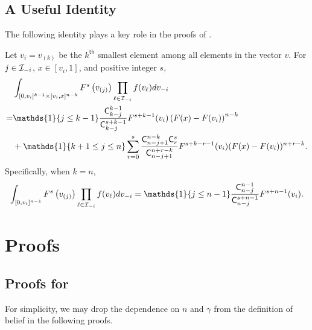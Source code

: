 \subsection{A Useful Identity}
\label{app_subec:identity}
The following identity plays a key role in the proofs of .
\begin{lemma}
\label{lem:useful_identity} Let $v_i = v_{(k)}$ be the $k^{\mathsf{th}}$ smallest element among all elements in the vector $v$. For $j\in \mathcal{I}_{-i}$, $x\in [v_i, 1]$, and positive integer $s$, 
\begin{align*}
    &\int_{[0,v_i]^{k-1}\times[v_i,x]^{n-k}}F^s\left(v_{(j)}\right) \prod_{\ell \in \I_{-i}}f(v_{\ell})dv_{-i}\\
    =&\mathds{1}\{j\leq k-1\}\frac{\C^{k-1}_{k-j}}{\C^{s+k-1}_{k-j}} F^{s+k-1}(v_i)\left(F(x)-F(v_i)\right)^{n-k} \\
    & + \mathds{1}\{k+1\leq j \leq n\} \sum_{r=0}^s\frac{\C_{n-j+1}^{n-k}\C_r^s}{\C_{n-j+1}^{n+r-k}}F^{s+k-r-1}(v_i)(F(x)-F(v_i))^{n+r-k}.
\end{align*}
Specifically, when $k=n$, 
\begin{align*}
\int_{ [0,v_i]^{n-1}}F^s\left(v_{(j)}\right) \prod_{\ell \in \I_{-i}}f(v_{\ell})dv_{-i} = \mathds{1}\{j\leq n-1\}\frac{\C^{n-1}_{n-j}}{\C^{s+n-1}_{n-j}} F^{s+n-1}(v_i).
\end{align*}
\end{lemma}



\section{Proofs}
\label{app_sec:proofs}


\subsection{Proofs for }
For simplicity, we may drop the dependence on $n$ and $\gamma$ from the definition of belief in the following proofs.

